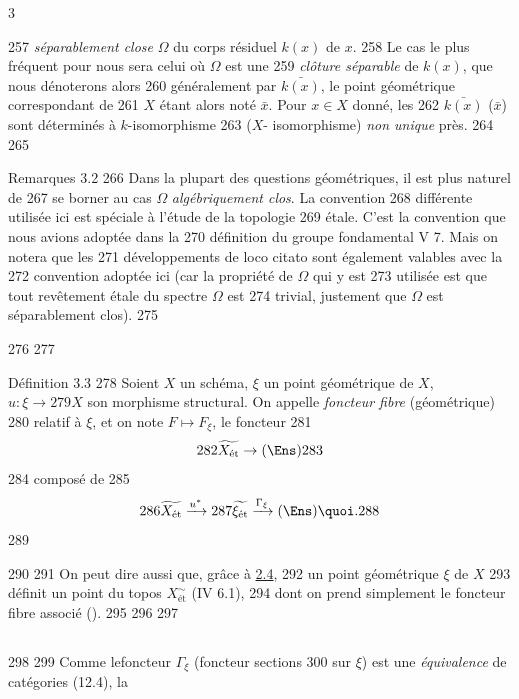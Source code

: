 3	\documentclass[10pt]{../fichiers-configuration-latex/smfart}
\begin{document}
   257	\emph{séparablement close} $\Omega$ du corps résiduel $k(x)$ de $x$.
   258	Le cas le plus fréquent pour nous sera celui où $\Omega$ est une
   259	\emph{clôture séparable} de $k(x)$, que nous dénoterons alors
   260	généralement par $\bar{k(x)}$, le point géométrique correspondant de
   261	$X$ étant alors noté $\bar{x}$. Pour $x \in X$ donné, les
   262	$\bar{k(x)}$ (\resp $\bar{x}$) sont déterminés à $k$-isomorphisme
   263	(\resp $X$- isomorphisme) \emph{non unique} près.
   264	
   265	\begin{enonce*}[remark]{Remarques 3.2}
   266	Dans la plupart des questions géométriques, il est plus naturel de
   267	se borner au cas $\Omega$ \emph{algébriquement clos}. La convention
   268	différente utilisée ici est spéciale à l'étude de la topologie
   269	étale. C'est la convention que nous avions adoptée dans la
   270	définition du groupe fondamental  V 7. Mais on notera que les
   271	développements de loco citato sont également valables avec la
   272	convention adoptée ici (car la propriété de $\Omega$ qui y est
   273	utilisée est que tout revêtement étale du spectre $\Omega$ est
   274	trivial, \ie justement que $\Omega$ est séparablement clos).
   275	\end{enonce*}
   276	
   277	\begin{enonce*}{Définition 3.3}
   278	Soient $X$ un schéma, $\xi$ un point géométrique de $X$, $u : \xi \to
   279	X$ son morphisme structural. On appelle \emph{foncteur fibre} (géométrique)
   280	relatif à $\xi$, et on note $F \mapsto F_{\xi}$, le foncteur
   281	$$
   282	\widetilde{X_{\text{\rm ét}}} \to (\Ens)
   283	$$
   284	composé de
   285	$$
   286	\widetilde{X_{\text{\rm ét}}} \xrightarrow{u^{\ast}}
   287	\widetilde{\xi_{\text{\rm ét}}} \xrightarrow{\Gamma_{\xi}} (\Ens){\quoi}.
   288	$$
   289	\end{enonce*}
   290	
   291	On peut dire aussi que, grâce à \hyperref[VIII.cor2.4]{2.4},
   292	un point géométrique $\xi$ de $X$
   293	définit un point du topos $X^{\sim}_{\text{ét}}$ (IV 6.1),
   294	dont on prend  simplement le foncteur fibre associé (\loccit).
   295	
   296	\setcounter{subsection}{3}
   297	\subsection{}
   298	
   299	Comme le\pageoriginale  foncteur $\Gamma_{\xi}$ (foncteur sections
   300	sur $\xi$) est une \emph{équivalence} de catégories (12.4), la
\end{document}
